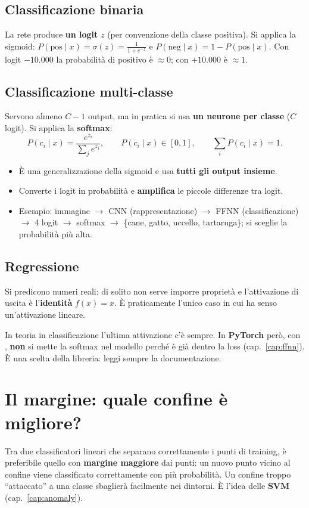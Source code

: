 \subsection{Classificazione binaria}
La rete produce \textbf{un logit} $z$ (per convenzione della classe positiva). Si applica la sigmoid:
$P(\text{pos}\mid x) = \sigma(z) = \frac{1}{1+e^{-z}}$ e $P(\text{neg}\mid x) = 1 - P(\text{pos}\mid x)$.
Con logit $-10.000$ la probabilità di positivo è $\approx 0$; con $+10.000$ è $\approx 1$.

\subsection{Classificazione multi-classe}
Servono almeno $C-1$ output, ma in pratica si usa \textbf{un neurone per classe} ($C$ logit). Si applica la
\textbf{softmax}:
\[
P(c_i \mid x) = \frac{e^{z_i}}{\sum_{j} e^{z_j}}, \qquad P(c_i\mid x) \in [0,1], \qquad \sum_i P(c_i \mid x) = 1.
\]
\begin{itemize}
  \item È una generalizzazione della sigmoid e usa \textbf{tutti gli output insieme}.
  \item Converte i logit in probabilità e \textbf{amplifica} le piccole differenze tra logit.
  \item Esempio: immagine $\to$ CNN (rappresentazione) $\to$ FFNN (classificazione) $\to$ 4 logit $\to$ softmax $\to$
        \{cane, gatto, uccello, tartaruga\}; si sceglie la probabilità più alta.
\end{itemize}

\subsection{Regressione}
Si predicono numeri reali: di solito non serve imporre proprietà e l'attivazione di uscita è l'\textbf{identità}
$f(x)=x$. È praticamente l'unico caso in cui ha senso un'attivazione lineare.

\begin{attenzione}
In teoria in classificazione l'ultima attivazione c'è sempre. In \textbf{PyTorch} però, con ,
\textbf{non} si mette la softmax nel modello perché è già dentro la loss (cap.~\ref{cap:ffnn}). È una scelta della libreria:
leggi sempre la documentazione.
\end{attenzione}
\section{Il margine: quale confine è migliore?}
Tra due classificatori lineari che separano correttamente i punti di training, è preferibile quello con
\textbf{margine maggiore} dai punti: un nuovo punto vicino al confine viene classificato correttamente con più probabilità.
Un confine troppo ``attaccato'' a una classe sbaglierà facilmente nei dintorni. È l'idea delle \textbf{SVM}
(cap.~\ref{cap:anomaly}).

